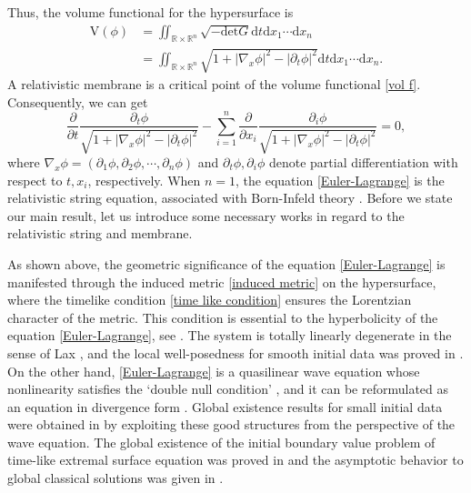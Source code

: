 \documentclass[10pt,leqno]{amsart}
\numberwithin{equation}{section}
\begin{document}
Thus, the volume functional for the hypersurface is
\begin{equation} \label{vol f}
	\begin{aligned}
		\mathrm{V} (\phi) 	&= \iint_{\mathbb{R} \times \mathbb{R}^{n}} \sqrt{- \mathrm{det} G} \mathrm{d}t\mathrm{d}x_{1} \cdots \mathrm{d}x_{n} \\
		& =\iint_{\mathbb{R} \times \mathbb{R}^{n}} \sqrt{1+|\nabla_{x}\phi|^{2}-|\partial_{t} \phi|^{2}} \mathrm{d}t\mathrm{d}x_{1}\cdots \mathrm{d}x_{n}.
	\end{aligned}
\end{equation}
A relativistic membrane is a critical point of the volume functional \eqref{vol f}. Consequently, we can get
\begin{equation} \label{Euler-Lagrange}
	\frac{\partial}{\partial {t}}	\frac{\partial_{t} \phi}{\sqrt{1+|\nabla_{x}\phi|^{2}-|\partial_{t} \phi|^{2}}} - \sum\limits_{i=1}^{n} \frac{\partial}{\partial {x_{i}}}\frac{\partial_i \phi}{\sqrt{1+|\nabla_{x}\phi|^{2}-|\partial_{t} \phi|^{2}}}  = 0,
\end{equation}
where $\nabla_{x}\phi = ( \partial_{1} \phi,\partial_{2} \phi,\cdots, \partial_{n} \phi)$ and $\partial_{t} \phi,\partial_{i} \phi $ denote partial differentiation with respect to $t,x_{i}$, respectively. When $n=1$, the equation \eqref{Euler-Lagrange} is the relativistic string equation, associated with Born-Infeld theory  \cite{Brenier02,Gibbons98,Hoppe13}. Before we state our main result, let us introduce some necessary works in regard to the relativistic string and membrane.






As shown above, the geometric significance of the equation \eqref{Euler-Lagrange} is manifested through the induced metric \eqref{induced metric} on the hypersurface, where the timelike condition \eqref{time like condition} ensures the Lorentzian character of the metric. This condition is essential to the hyperbolicity of the equation \eqref{Euler-Lagrange}, see \cite{EggersHoppeHynek15,Wong11}. The system is totally linearly degenerate in the sense of Lax \cite{Lax86}, and the local well-posedness for smooth initial data was proved in \cite{AuriliaChristodoulou79}. On the other hand, \eqref{Euler-Lagrange} is a quasilinear wave equation whose nonlinearity satisfies the `double null condition' \cite{Klainerman84}, and it can be reformulated as an equation in divergence form \cite{Lindblad04}. Global existence results for small initial data were obtained in \cite{Allen06,Lindblad04} by exploiting these good structures from the perspective of the wave equation. The global existence of the initial boundary value problem of time-like extremal surface equation was proved in \cite{LiuZhou08,LiuZhou09} and the asymptotic behavior to global classical solutions was given in \cite{LiuZhou07}.
\end{document}
